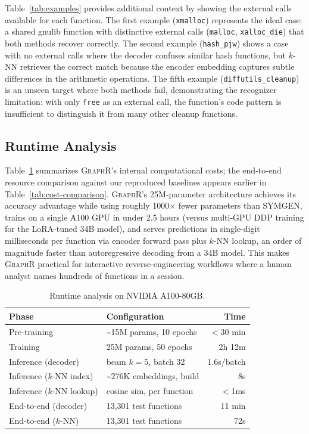 \documentclass[sigconf,nonacm]{acmart}
\newcommand{\sysname}{\textsc{GraphR}}
\begin{document}
Table~\ref{tab:examples} provides additional context by showing the external calls available for each function. The first example (\texttt{xmalloc}) represents the ideal case: a shared gnulib function with distinctive external calls (\texttt{malloc}, \texttt{xalloc\_die}) that both methods recover correctly. The second example (\texttt{hash\_pjw}) shows a case with no external calls where the decoder confuses similar hash functions, but $k$-NN retrieves the correct match because the encoder embedding captures subtle differences in the arithmetic operations. The fifth example (\texttt{diffutils\_cleanup}) is an unseen target where both methods fail, demonstrating the recognizer limitation: with only \texttt{free} as an external call, the function's code pattern is insufficient to distinguish it from many other cleanup functions.

\subsection{Runtime Analysis}

Table~\ref{tab:runtime} summarizes \sysname{}'s internal computational costs; the end-to-end resource comparison against our reproduced baselines appears earlier in Table~\ref{tab:cost-comparison}. \sysname{}'s 25M-parameter architecture achieves its accuracy advantage while using roughly 1000$\times$ fewer parameters than SYMGEN, trains on a single A100 GPU in under 2.5 hours (versus multi-GPU DDP training for the LoRA-tuned 34B model), and serves predictions in single-digit milliseconds per function via encoder forward pass plus $k$-NN lookup, an order of magnitude faster than autoregressive decoding from a 34B model. This makes \sysname{} practical for interactive reverse-engineering workflows where a human analyst names hundreds of functions in a session.

\begin{table}[t]
    \centering
    \caption{Runtime analysis on NVIDIA A100-80GB.}
    \label{tab:runtime}
    \footnotesize
    \begin{tabular}{llr}
        \toprule
        \textbf{Phase} & \textbf{Configuration} & \textbf{Time} \\
        \midrule
        Pre-training & \textasciitilde{}15M params, 10 epochs & $<$30 min \\
        Training & 25M params, 50 epochs & 2h 12m \\
        \midrule
        Inference (decoder) & beam $k{=}5$, batch 32 & 1.6s/batch \\
        Inference ($k$-NN index) & \textasciitilde{}276K embeddings, build & 8s \\
        Inference ($k$-NN lookup) & cosine sim, per function & $<$1ms \\
        \midrule
        End-to-end (decoder) & 13{,}301 test functions & 11 min \\
        End-to-end ($k$-NN) & 13{,}301 test functions & 72s \\
        \bottomrule
    \end{tabular}
\end{table}
\end{document}
